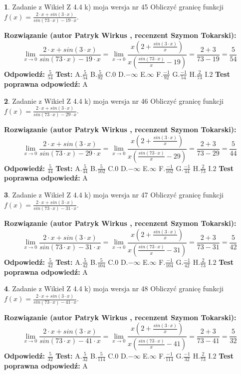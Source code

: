 \documentclass[12pt, a4paper]{article}
\theoremstyle{definition} %
\newtheorem{zad}{}
\newcommand{\zadStart}[1]{\begin{zad}#1\newline}
\newcommand{\zadStop}{\end{zad}}
\newcommand{\rozwStart}[2]{\noindent \textbf{Rozwiązanie (autor #1 , recenzent #2): }\newline}
\newcommand{\rozwStop}{\newline}
\newcommand{\odpStart}{\noindent \textbf{Odpowiedź:}\newline}
\newcommand{\odpStop}{\newline}
\newcommand{\testStart}{\noindent \textbf{Test:}\newline}
\newcommand{\testStop}{\newline}
\newcommand{\kluczStart}{\noindent \textbf{Test poprawna odpowiedź:}\newline}
\newcommand{\kluczStop}{\newline}
\begin{document}
\zadStart{Zadanie z Wikieł Z 4.4 k) moja wersja nr 45}
Obliczyć granicę funkcji $f(x)=\frac{2\cdot x +sin(3\cdot x)}{sin(73\cdot x) -19\cdot x}$.
\zadStop
\rozwStart{Patryk Wirkus}{Szymon Tokarski}
$$\lim\limits_{x\to 0}\frac{2\cdot x +sin(3\cdot x)}{sin(73\cdot x) -19\cdot x}
=\lim\limits_{x\to 0}\frac{x(2+\frac{sin(3\cdot x)}{x})}{x(\frac{sin(73\cdot x)}{x}-19)}
=\frac{2+3}{73-19} = \frac{5}{54}$$
\rozwStop
\odpStart
$\frac{5}{54}$
\odpStop
\testStart
A.$\frac{5}{54}$
B.$\frac{5}{92}$
C.$0$
D.$-\infty$
E.$\infty$
F.$\frac{-1}{92}$
G.$\frac{-1}{54}$
H.$\frac{2}{73}$
I.$2$
\testStop
\kluczStart
A
\kluczStop



\zadStart{Zadanie z Wikieł Z 4.4 k) moja wersja nr 46}
Obliczyć granicę funkcji $f(x)=\frac{2\cdot x +sin(3\cdot x)}{sin(73\cdot x) -29\cdot x}$.
\zadStop
\rozwStart{Patryk Wirkus}{Szymon Tokarski}
$$\lim\limits_{x\to 0}\frac{2\cdot x +sin(3\cdot x)}{sin(73\cdot x) -29\cdot x}
=\lim\limits_{x\to 0}\frac{x(2+\frac{sin(3\cdot x)}{x})}{x(\frac{sin(73\cdot x)}{x}-29)}
=\frac{2+3}{73-29} = \frac{5}{44}$$
\rozwStop
\odpStart
$\frac{5}{44}$
\odpStop
\testStart
A.$\frac{5}{44}$
B.$\frac{5}{102}$
C.$0$
D.$-\infty$
E.$\infty$
F.$\frac{-1}{102}$
G.$\frac{-1}{44}$
H.$\frac{2}{73}$
I.$2$
\testStop
\kluczStart
A
\kluczStop



\zadStart{Zadanie z Wikieł Z 4.4 k) moja wersja nr 47}
Obliczyć granicę funkcji $f(x)=\frac{2\cdot x +sin(3\cdot x)}{sin(73\cdot x) -31\cdot x}$.
\zadStop
\rozwStart{Patryk Wirkus}{Szymon Tokarski}
$$\lim\limits_{x\to 0}\frac{2\cdot x +sin(3\cdot x)}{sin(73\cdot x) -31\cdot x}
=\lim\limits_{x\to 0}\frac{x(2+\frac{sin(3\cdot x)}{x})}{x(\frac{sin(73\cdot x)}{x}-31)}
=\frac{2+3}{73-31} = \frac{5}{42}$$
\rozwStop
\odpStart
$\frac{5}{42}$
\odpStop
\testStart
A.$\frac{5}{42}$
B.$\frac{5}{104}$
C.$0$
D.$-\infty$
E.$\infty$
F.$\frac{-1}{104}$
G.$\frac{-1}{42}$
H.$\frac{2}{73}$
I.$2$
\testStop
\kluczStart
A
\kluczStop



\zadStart{Zadanie z Wikieł Z 4.4 k) moja wersja nr 48}
Obliczyć granicę funkcji $f(x)=\frac{2\cdot x +sin(3\cdot x)}{sin(73\cdot x) -41\cdot x}$.
\zadStop
\rozwStart{Patryk Wirkus}{Szymon Tokarski}
$$\lim\limits_{x\to 0}\frac{2\cdot x +sin(3\cdot x)}{sin(73\cdot x) -41\cdot x}
=\lim\limits_{x\to 0}\frac{x(2+\frac{sin(3\cdot x)}{x})}{x(\frac{sin(73\cdot x)}{x}-41)}
=\frac{2+3}{73-41} = \frac{5}{32}$$
\rozwStop
\odpStart
$\frac{5}{32}$
\odpStop
\testStart
A.$\frac{5}{32}$
B.$\frac{5}{114}$
C.$0$
D.$-\infty$
E.$\infty$
F.$\frac{-1}{114}$
G.$\frac{-1}{32}$
H.$\frac{2}{73}$
I.$2$
\testStop
\kluczStart
A
\kluczStop
\end{document}
